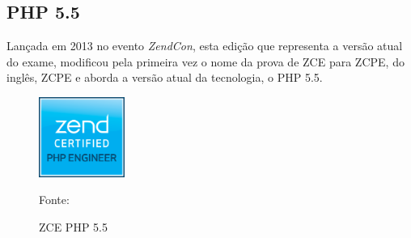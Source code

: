 \FloatBarrier 	%
				

\subsection{PHP 5.5}

Lançada em 2013 no evento \textit{ZendCon}, esta edição que representa a versão
atual do exame, modificou pela primeira vez o nome da prova de \acs{ZCE} para
\acs{ZCPE}, do inglês, \acl{ZCPE} e aborda a versão atual da tecnologia, o
PHP 5.5.

\begin{figure}[h!tb]
	\caption{ZCE PHP 5.5}
	\label{fig:logoCertificationPHP55}

	\centering
	\includegraphics[width=0.25\textwidth]{images/logo/php5-5.png}

	\centering
	\footnotesize Fonte: 
\end{figure}

\FloatBarrier 	%
			
